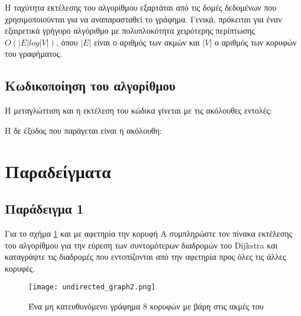 Η ταχύτητα εκτέλεσης του αλγορίθμου εξαρτάται από τις δομές δεδομένων που χρησιμοποιούνται για να αναπαρασταθεί το γράφημα. Γενικά, πρόκειται για έναν εξαιρετικά γρήγορο αλγόριθμο με πολυπλοκότητα χειρότερης περίπτωσης $O(|E| log |V|)$, όπου $|E|$ είναι ο αριθμός των ακμών και $|V|$ ο αριθμός των κορυφών του γραφήματος.

\subsection{Κωδικοποίηση του αλγορίθμου}






Η μεταγλώττιση και η εκτέλεση του κώδικα γίνεται με τις ακόλουθες εντολές:



Η δε έξοδος που παράγεται είναι η ακόλουθη:




\section{Παραδείγματα}

\subsection{Παράδειγμα 1}
Για το σχήμα \ref{fig:undirected_graph2} και με αφετηρία την κορυφή A συμπληρώστε τον πίνακα εκτέλεσης του αλγορίθμου για την εύρεση των συντομότερων διαδρομών του Dijkstra και καταγράψτε τις διαδρομές που εντοπίζονται από την αφετηρία προς όλες τις άλλες κορυφές.

\begin{figure}[ht!]
	\centering
	\texttt{[image: undirected\_graph2.png]}
	\caption{Ένα μη κατευθυνόμενο γράφημα 8 κορυφών με βάρη στις ακμές του}
	\label{fig:undirected_graph2}
\end{figure}

